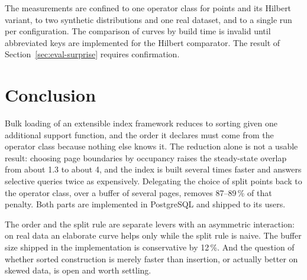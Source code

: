 The measurements are confined to one operator class for points and its Hilbert
variant, to two synthetic distributions and one real dataset, and to a single
run per configuration. The comparison of curves by build time is invalid until
abbreviated keys are implemented for the Hilbert comparator. The result of
Section~\ref{sec:eval-surprise} requires confirmation.

\section{Conclusion}

Bulk loading of an extensible index framework reduces to sorting given one
additional support function, and the order it declares must come from the
operator class because nothing else knows it. The reduction alone is not a usable
result: choosing page boundaries by occupancy raises the steady-state overlap
from about 1.3 to about 4, and the index is built several times faster and
answers selective queries twice as expensively. Delegating the choice of split
points back to the operator class, over a buffer of several pages, removes
87--89\,\% of that penalty. Both parts are implemented in PostgreSQL and shipped
to its users.

The order and the split rule are separate levers with an asymmetric interaction:
on real data an elaborate curve helps only while the split rule is naive. The
buffer size shipped in the implementation is conservative by 12\,\%. And the
question of whether sorted construction is merely faster than insertion, or
actually better on skewed data, is open and worth settling.
